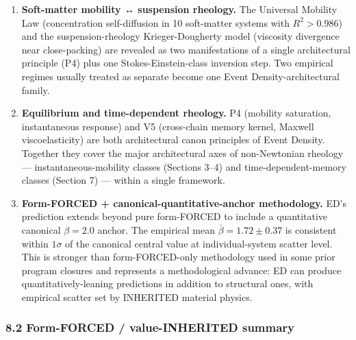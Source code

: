 \documentclass[
  11pt,a4paper]{article}
\begin{document}
\begin{enumerate}
\def\labelenumi{\arabic{enumi}.}
\item
  \textbf{Soft-matter mobility ↔ suspension rheology.} The Universal
  Mobility Law (concentration self-diffusion in 10 soft-matter systems
  with \(R^2 > 0.986\)) and the suspension-rheology Krieger-Dougherty
  model (viscosity divergence near close-packing) are revealed as two
  manifestations of a single architectural principle (P4) plus one
  Stokes-Einstein-class inversion step. Two empirical regimes usually
  treated as separate become one Event Density-architectural family.
\item
  \textbf{Equilibrium and time-dependent rheology.} P4 (mobility
  saturation, instantaneous response) and V5 (cross-chain memory kernel,
  Maxwell viscoelasticity) are both architectural canon principles of
  Event Density. Together they cover the major architectural axes of
  non-Newtonian rheology --- instantaneous-mobility classes (Sections
  3--4) and time-dependent-memory classes (Section 7) --- within a
  single framework.
\item
  \textbf{Form-FORCED + canonical-quantitative-anchor methodology.} ED's
  prediction extends beyond pure form-FORCED to include a quantitative
  canonical \(\beta = 2.0\) anchor. The empirical mean
  \(\bar\beta = 1.72 \pm 0.37\) is consistent within \(1\sigma\) of the
  canonical central value at individual-system scatter level. This is
  stronger than form-FORCED-only methodology used in some prior program
  closures and represents a methodological advance: ED can produce
  quantitatively-leaning predictions in addition to structural ones,
  with empirical scatter set by INHERITED material physics.
\end{enumerate}

\subsubsection{8.2 Form-FORCED / value-INHERITED
summary}\label{form-forced-value-inherited-summary}
\end{document}
